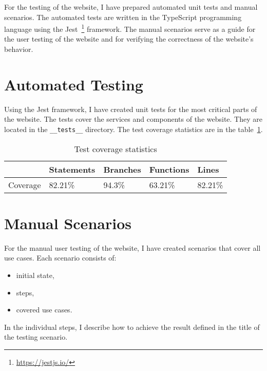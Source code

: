 For the testing of the website, I have prepared automated unit tests and manual scenarios.
The automated tests are written in the TypeScript programming language using the Jest~\footnote{\url{https://jestjs.io/}} framework.
The manual scenarios serve as a guide for the user testing of the website
and for verifying the correctness of the website's behavior.


\section{Automated Testing}
Using the Jest framework, I have created unit tests for the most critical parts of the website.
The tests cover the services and components of the website.
They are located in the \texttt{\_\_tests\_\_} directory.
The test coverage statistics are in the table~\ref{tab:tests-coverage}.

\begin{table}[hbt!]
    \centering
    \captionsetup{justification=centering}
    \begin{tabular}{|l|l|l|l|l|}
        \hline
        ~        & Statements & Branches & Functions & Lines   \\
        \hline
        Coverage & 82.21\%    & 94.3\%   & 63.21\%   & 82.21\% \\
        \hline
    \end{tabular}
    \caption{Test coverage statistics}
    \label{tab:tests-coverage}
\end{table}


\section{Manual Scenarios}
For the manual user testing of the website, I have created scenarios that cover all use cases.
Each scenario consists of:
\begin{itemize}
    \item initial state,
    \item steps,
    \item covered use cases.
\end{itemize}

In the individual steps, I describe how to achieve the result defined in the title of the testing scenario.

\newcommand{\testing}[2]{%
    \stepcounter{testingcounter}%
    \subsection{T\arabic{testingcounter} -- #1}
}



